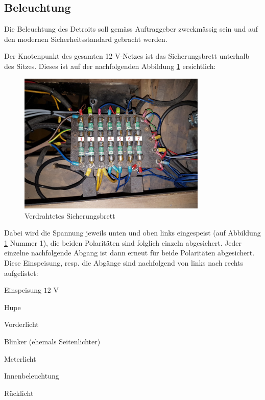 \subsection{Beleuchtung}

Die Beleuchtung des Detroits soll gemäss Auftraggeber zweckmässig sein und auf den modernen Sicherheitsstandard gebracht werden.

\color{blue}
Der Knotenpunkt des gesamten 12 V-Netzes ist das Sicherungsbrett unterhalb des Sitzes. Dieses ist auf der nachfolgenden Abbildung \ref{fig:Sicherungsbrett} ersichtlich:

\begin{figure}[h!]
	\centering
		\includegraphics[width=0.8\textwidth]{images/Sicherungsbrett}
	\caption{Verdrahtetes Sicherungsbrett}
	\label{fig:Sicherungsbrett}
\end{figure}

Dabei wird die Spannung jeweils unten und oben links eingespeist (auf Abbildung \ref{fig:Sicherungsbrett} Nummer 1), die beiden Polaritäten sind folglich einzeln abgesichert. Jeder einzelne nachfolgende Abgang ist dann erneut für beide Polaritäten abgesichert. Diese Einspeisung, resp. die Abgänge sind nachfolgend von links nach rechts aufgelistet:

\begin{compactenum}
\item Einspeisung $12$ V
\item Hupe
\item Vorderlicht
\item Blinker (ehemals Seitenlichter)
\item Meterlicht
\item Innenbeleuchtung
\item Rücklicht
\end{compactenum}

